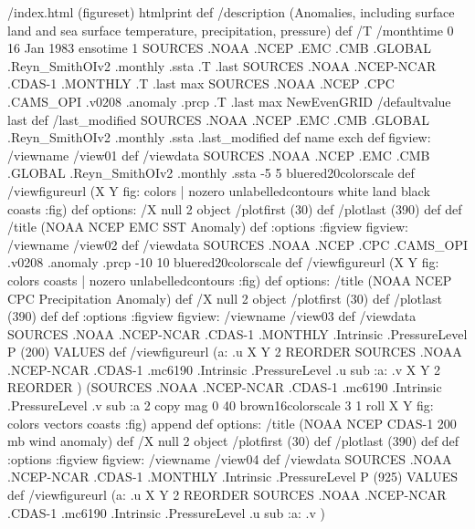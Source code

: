 \begin{ingrid}
/index.html {(figureset) htmlprint} def
/description (Anomalies, including surface land and sea surface temperature, precipitation, pressure) def
/T 
/monthtime
0
16 Jan 1983 ensotime
1
SOURCES .NOAA .NCEP .EMC .CMB .GLOBAL .Reyn_SmithOIv2 .monthly .ssta
.T .last
SOURCES .NOAA .NCEP-NCAR .CDAS-1 .MONTHLY .T .last
max
SOURCES .NOAA .NCEP .CPC .CAMS_OPI .v0208 .anomaly .prcp .T .last
max
NewEvenGRID
/defaultvalue last def
/last_modified
SOURCES .NOAA .NCEP .EMC .CMB .GLOBAL .Reyn_SmithOIv2 .monthly .ssta
.last_modified def
name exch def
figview:
/viewname /view01 def
/viewdata SOURCES .NOAA .NCEP .EMC .CMB .GLOBAL .Reyn_SmithOIv2 .monthly .ssta
-5 5 bluered20colorscale
def
/viewfigureurl (X Y fig: colors | nozero unlabelledcontours white land black coasts :fig) def
options:
/X null 2 object
/plotfirst (30) def
/plotlast (390) def
def
/title (NOAA NCEP EMC SST Anomaly) def
:options
:figview
figview:
/viewname /view02 def
/viewdata 
SOURCES .NOAA .NCEP .CPC .CAMS_OPI .v0208 .anomaly .prcp
-10 10 bluered20colorscale
  def
/viewfigureurl (X Y fig: colors coasts | nozero unlabelledcontours :fig) def
options:
/title (NOAA NCEP CPC Precipitation Anomaly) def
/X null 2 object
/plotfirst (30) def
/plotlast (390) def
def
:options
:figview
figview:
/viewname /view03 def
/viewdata  SOURCES .NOAA .NCEP-NCAR .CDAS-1 .MONTHLY .Intrinsic .PressureLevel
  P (200) VALUES
  def
/viewfigureurl (a: .u X Y 2 REORDER SOURCES .NOAA .NCEP-NCAR .CDAS-1 .mc6190 .Intrinsic .PressureLevel .u sub :a: .v X Y 2 REORDER )
(SOURCES .NOAA .NCEP-NCAR .CDAS-1 .mc6190 .Intrinsic .PressureLevel .v sub :a 2 copy  mag 0 40 brown16colorscale 3 1 roll X Y fig: colors vectors coasts :fig) append def
options:
/title (NOAA NCEP CDAS-1 200 mb wind anomaly) def
/X null 2 object
/plotfirst (30) def
/plotlast (390) def
def
:options
:figview
figview:
/viewname /view04 def
/viewdata  SOURCES .NOAA .NCEP-NCAR .CDAS-1 .MONTHLY .Intrinsic .PressureLevel
  P (925) VALUES
  def
/viewfigureurl (a: .u X Y 2 REORDER SOURCES .NOAA .NCEP-NCAR .CDAS-1 .mc6190 .Intrinsic .PressureLevel .u sub :a: .v )

\end{ingrid}
